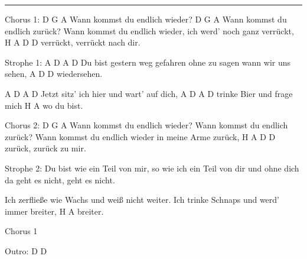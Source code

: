 \noindent\rule{\columnwidth}{1pt}

\begin{lstsong}
Chorus 1:
D                         G    A
Wann kommst du endlich wieder?
D                         G    A
Wann kommst du endlich zurück?
Wann kommst du endlich wieder,
ich werd' noch ganz verrückt,
  H           A          D    D
verrückt, verrückt nach dir.

Strophe 1:
A        D      A     D
Du bist gestern weg gefahren
ohne zu sagen wann wir uns sehen,
A     D       D
wiedersehen.

A               D         A        D
Jetzt sitz' ich hier und wart' auf dich,
A       D       A      D
trinke Bier und frage mich
H        A
wo du bist.

Chorus 2:
D                         G    A
Wann kommst du endlich wieder?
Wann kommst du endlich zurück?
Wann kommst du endlich wieder
in meine Arme zurück,
  H        A       D     D
zurück, zurück zu mir.

Strophe 2:
Du bist wie ein Teil von mir,
so wie ich ein Teil von dir
und ohne dich da geht es nicht,
geht es nicht.

Ich zerfließe wie Wachs 
und weiß nicht weiter.
Ich trinke Schnaps
und werd' immer breiter,
H   A
breiter.

Chorus 1

Outro: D D
\end{lstsong}
\newpage


